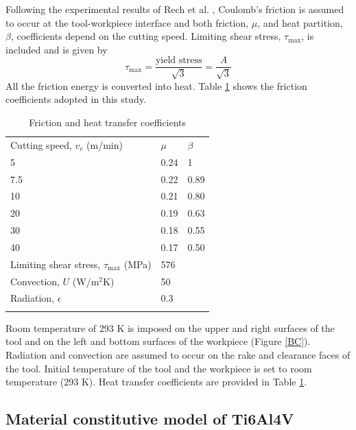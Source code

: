 \documentclass[preprint,12pt,times]{elsarticle}
\begin{document}
Following the experimental results of Rech et al. \cite{rech_Characterisation_2013}, Coulomb's friction is assumed to occur at the tool-workpiece interface and both friction, $\mu$, and heat partition, $\beta$, coefficients depend on the cutting speed. Limiting shear stress, $\tau_{\text{max}}$, is included and is given by
%
\begin{equation}
\tau_{\text{max}} = \frac{\text{yield stress}}{\sqrt{3}} = \frac{A}{\sqrt{3}}
\end{equation}
%
All the friction energy is converted into heat. Table \ref{tab:fricHeat} shows the friction coefficients adopted in this study.
%
\begin{table}[!h]
\begin{center}
\caption{\label{tab:fricHeat} Friction and heat transfer coefficients \cite{rech_Characterisation_2013, _GRANTA_2020}}
\begin{tabular}{lll}
\hline\noalign{\smallskip}
Cutting speed, $v_c$ (m/min) & $\mu$ & $\beta$\\
\noalign{\smallskip}\hline\noalign{\smallskip}
5 & 0.24 & 1\\
7.5 & 0.22 & 0.89\\
10 & 0.21 & 0.80\\
20 & 0.19 & 0.63\\
30 & 0.18 & 0.55\\
40 & 0.17 & 0.50\\
\noalign{\smallskip}\hline\noalign{\smallskip}
Limiting shear stress, $\tau_{\text{max}}$ (MPa) & 576\\
Convection, $U$ (W/m$^2$K) & 50\\
Radiation, $\epsilon$ & 0.3\\
\noalign{\smallskip}\hline\noalign{\smallskip}
\end{tabular}
\end{center}
\end{table}
%

Room temperature of 293 K is imposed on the upper and right surfaces of the tool and on the left and bottom surfaces of the workpiece (Figure \ref{BC}). Radiation and convection are assumed to occur on the rake and clearance faces of the tool. Initial temperature of the tool and the workpiece is set to room temperature (293 K). Heat transfer coefficients are provided in Table \ref{tab:fricHeat}.

\subsection{Material constitutive model of Ti6Al4V}
\end{document}
